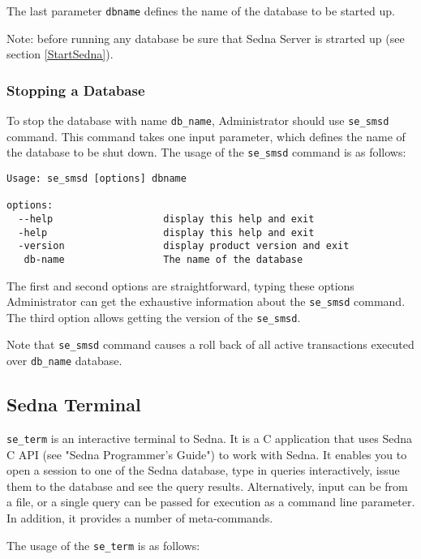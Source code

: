 \documentclass[a4paper,12pt]{article}
\begin{document}
The last parameter \verb!dbname!  defines the name of the database to be started up.


Note: before running any database be sure that Sedna Server is strarted up (see section \ref{StartSedna}).

\subsubsection{Stopping a Database}
\label{StopDB}

To stop the database with name \verb!db_name!, Administrator should use \verb!se_smsd! command. This command takes one input parameter, which defines the name of the database to be shut down. The usage of the \verb!se_smsd! command is as follows:

\begin{verbatim}
Usage: se_smsd [options] dbname

options:
  --help                   display this help and exit
  -help                    display this help and exit
  -version                 display product version and exit
   db-name                 The name of the database
\end{verbatim}

The first and second options are straightforward, typing these options Administrator can get the exhaustive information about the \verb!se_smsd! command.
The third option allows getting the version of the \verb!se_smsd!.

Note that \verb!se_smsd! command causes a roll back of all active transactions executed over \verb!db_name! database.


\subsection{Sedna Terminal}
\label{terminal}
\verb!se_term! is an interactive terminal to Sedna. It is a C application that uses Sedna C API (see "Sedna Programmer's Guide") to work with Sedna. It enables you to open a session to one of the Sedna database, type in queries interactively, issue them to the database and see the query results. Alternatively, input can be from a file, or a single query can be passed for execution as a command line parameter.
In addition, it provides a number of meta-commands.

The usage of the \verb!se_term! is as follows:
\end{document}

